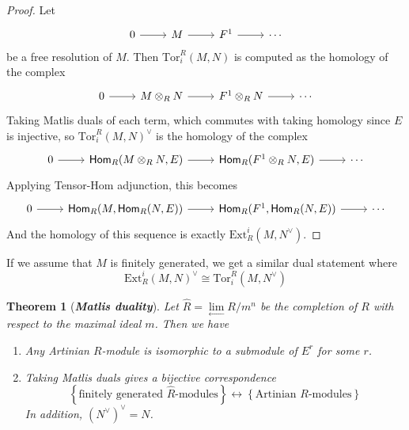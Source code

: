 \documentclass[psamsfonts, 12pt]{amsart}
\newtheorem{thm}{Theorem}[section]
\theoremstyle{definition}
\theoremstyle{remark}
\renewcommand{\hom}{\mathsf{Hom}}
\newcommand{\ib}[1]{\textbf{\textit{#1}}}
\newcommand{\set}[1]{\left\lbrace #1 \right\rbrace}
\begin{document}
\begin{proof}
Let
\[\begin{tikzcd}
0 \ar[r] & M \ar[r] & F^1 \ar[r] & \cdots
\end{tikzcd}\]
be a free resolution of $M$. Then $\mathrm{Tor}^R_i(M,N)$ is computed as
the homology of the complex
\[\begin{tikzcd}
0 \ar[r] & M \otimes_R N \ar[r] & F^1 \otimes_R N \ar[r] & \cdots
\end{tikzcd}\]
Taking Matlis duals of each term, which commutes with taking homology since $E$ is
injective, so $\mathrm{Tor}^R_i(M,N)^\vee$ is the homology of the complex
\[\begin{tikzcd}
0 \ar[r] & \hom_R(M \otimes_R N, E) \ar[r] & \hom_R(F^1\otimes_R N, E) \ar[r] & \cdots
\end{tikzcd}\]
Applying Tensor-Hom adjunction, this becomes
\[\begin{tikzcd}
0 \ar[r] & \hom_R(M, \hom_R(N,E)) \ar[r] & \hom_R(F^1, \hom_R(N,E)) \ar[r] & \cdots
\end{tikzcd}\]
And the homology of this sequence is exactly $\mathrm{Ext}^i_R(M,N^\vee)$.
\end{proof}
%
If we assume that $M$ is finitely generated, we get a similar dual statement where
\[
\mathrm{Ext}^i_R(M,N)^\vee \cong \mathrm{Tor}^R_i(M,N^\vee)
\]
%
\begin{thm}[\ib{Matlis duality}]
Let $\hat{R} = \lim\limits_{\longleftarrow} R/m^n$ be the completion of $R$ with
respect to the maximal ideal $m$. Then we have
\begin{enumerate}
  \item Any Artinian $R$-module is isomorphic to a submodule of $E^r$ for some $r$.
  \item Taking Matlis duals gives a bijective correspondence
  \[
  \set{\text{finitely generated } \hat{R}\text{-modules}} \longleftrightarrow
  \set{\text{Artinian } R\text{-modules}}
  \]
  In addition, $(N^\vee)^\vee  = N$.
\end{enumerate}
\end{thm}
%

%
\end{document}
